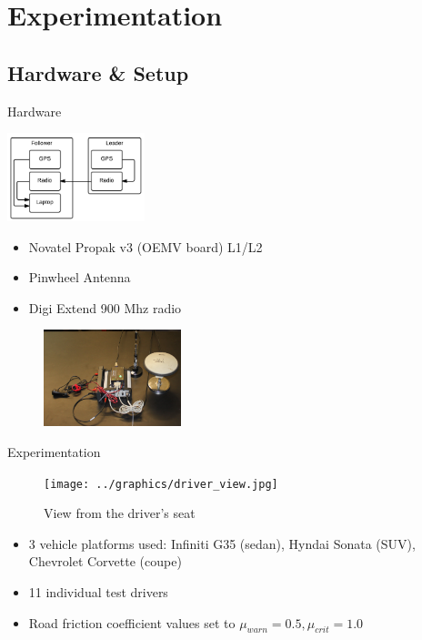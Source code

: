 \documentclass{beamer}
\begin{document}
\section{Experimentation}

  \subsection{Hardware \& Setup}

    \begin{frame}{Hardware}

        \begin{minipage}{0.45\textwidth}
          \centering
          \includegraphics[width=4cm]{../graphics/hardware_flow.png}
        \end{minipage}
        \begin{minipage}{0.45\textwidth}
          \begin{itemize}
            \item Novatel Propak v3 (OEMV board) L1/L2
            \item Pinwheel Antenna
            \item Digi Extend 900 Mhz radio
          \end{itemize}
        \end{minipage}

        \begin{figure}
          \includegraphics[width=4cm]{../graphics/lead_hardware.jpg}
        \end{figure}

    \end{frame}

    \begin{frame}{Experimentation}
      \begin{figure}[ht] \centering
        \texttt{[image: ../graphics/driver\_view.jpg]}
        \caption{View from the driver's seat} \label{fig:driver_view}
      \end{figure}

      \begin{itemize}
        \item 3 vehicle platforms used: Infiniti G35 (sedan), Hyndai Sonata (SUV), Chevrolet Corvette (coupe)
        \item 11 individual test drivers
        \item Road friction coefficient values set to $\mu_{warn}=0.5,\mu_{crit}=1.0$
      \end{itemize}
    \end{frame}
\end{document}
